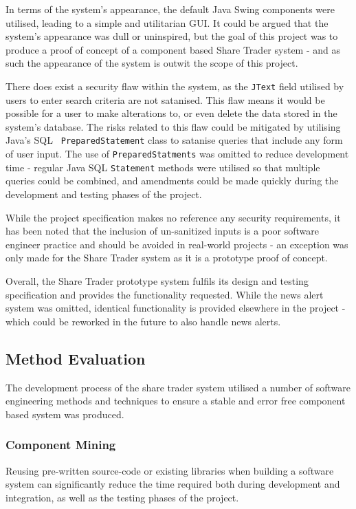 \documentclass[12pt, a4paper,titlepage]{article}
\begin{document}
In terms of the system’s appearance, the default Java Swing components were
utilised, leading to a simple and utilitarian GUI. 
It could be argued that the system's appearance was dull or uninspired, but
the goal of this project was to produce a proof of concept of a component
based Share Trader system - and as such the appearance of the system is outwit
the scope of this project.

There does exist a security flaw within the system, as the {\tt JText} field
utilised by users to enter search criteria are not satanised. 
This flaw means it would be possible for a user to make alterations to, or
even delete the data stored in the system’s database. 
The risks related to this flaw could be mitigated by utilising Java's SQL {\tt
PreparedStatement} class to satanise queries that include any form of user
input.
The use of {\tt PreparedStatments} was omitted to reduce development time -
regular Java SQL {\tt Statement} methods  were utilised so that multiple
queries could be combined, and amendments could be made quickly during the
development and testing phases of the project.  

While the project specification makes no reference any security requirements,
it has been noted that the inclusion of un-sanitized inputs is a poor software
engineer practice and should be avoided in real-world projects - an exception
was only made for the Share Trader system as it is a prototype proof of
concept.

Overall, the Share Trader prototype system fulfils its design and testing
specification and provides the functionality requested. 
While the news alert system was omitted, identical functionality is provided
elsewhere in the project - which could be reworked in the future to also
handle news alerts.

\subsection{Method Evaluation}
The development process of the share trader system utilised a number of
software engineering methods and techniques to ensure a stable and error free
component based system was produced.  

\subsubsection{Component Mining}
Reusing pre-written source-code or existing libraries when building a software
system can significantly reduce the time required both during development
and integration, as well as the testing phases of the project.
\end{document}
